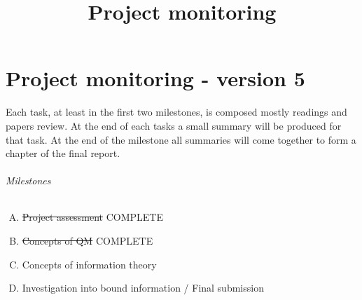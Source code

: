 \documentclass{article}
\title{Project monitoring}
\begin{document}
\part*{Project monitoring - version 5}
Each task, at least in the first two milestones, is composed mostly readings and papers review.
At the end of each tasks a small summary will be produced for that task. 
At the end of the milestone all summaries will come together to form a chapter of the final report. \\

\paragraph*{Milestones}
\begin{enumerate}[A)]
\item \sout{Project assessment} COMPLETE 
\item \sout{Concepts of QM} COMPLETE
\item Concepts of information theory
\item Investigation into bound information / Final submission
\end{enumerate}
\end{document}
